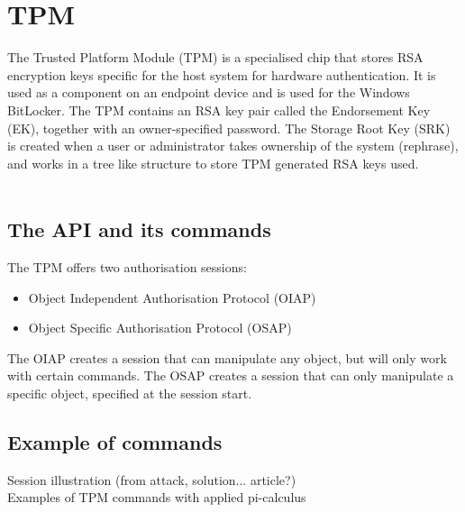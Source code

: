 \section{TPM}
The Trusted Platform Module (TPM) is a specialised chip that stores RSA encryption keys specific for the host system for hardware authentication. It is used as a component on an endpoint device and is used for the Windows BitLocker.
The TPM contains an RSA key pair called the Endorsement Key (EK), together with an owner-specified password. The Storage Root Key (SRK) is created when a user or administrator takes ownership of the system (rephrase), and works in a tree like structure to store TPM generated RSA keys used. \\ \\

\subsection{The API and its commands}
The TPM offers two authorisation sessions:
\begin{itemize}
  \item Object Independent Authorisation Protocol (OIAP)
  \item Object Specific Authorisation Protocol (OSAP)
\end{itemize}
The OIAP creates a session that can manipulate any object, but will only work with certain commands. The OSAP creates a session that can only manipulate a specific object, specified at the session start.

\subsection{Example of commands}
Session illustration (from attack, solution... article?) \\
Examples of TPM commands with applied pi-calculus

